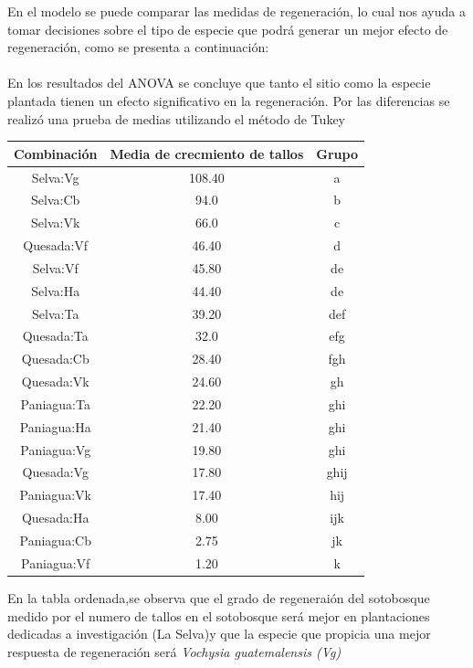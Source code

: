 \documentclass[12pt,a4paper]{report}
\begin{document}
\begin{enumerate}
\begin{itemize}
En el modelo se puede comparar las medidas de regeneración, lo cual nos ayuda a tomar decisiones sobre el tipo de especie que podrá generar un mejor efecto de regeneración, como se presenta a continuación: \\
\\
En los resultados del ANOVA se concluye que tanto el sitio como la especie plantada tienen un efecto significativo en la regeneración.
Por las diferencias se realizó una prueba de medias utilizando el método de Tukey \\
\begin{center}
\begin{tabular}{|c|c|c|}
\hline 
Combinación & Media de crecmiento de tallos & Grupo \\ 
\hline 
Selva:Vg  & 108.40 & a\\
\hline 
Selva:Cb & 94.0 & b\\
\hline 
Selva:Vk & 66.0 & c\\
\hline 
Quesada:Vf & 46.40 & d\\
\hline 
Selva:Vf & 45.80 & de\\
\hline 
Selva:Ha &  44.40 & de\\
\hline 
Selva:Ta &  39.20 & def\\
\hline 
Quesada:Ta &  32.0 & efg\\
\hline 
Quesada:Cb & 28.40 & fgh\\
\hline 
Quesada:Vk & 24.60 & gh\\
\hline 
Paniagua:Ta & 22.20 & ghi\\
\hline 
Paniagua:Ha & 21.40 & ghi\\
\hline 
Paniagua:Vg & 19.80 & ghi\\
\hline 
Quesada:Vg  & 17.80 & ghij\\
\hline 
Paniagua:Vk & 17.40 & hij\\
\hline 
Quesada:Ha & 8.00 & ijk\\
\hline 
Paniagua:Cb & 2.75 & jk\\
\hline 
Paniagua:Vf & 1.20 &  k\\ 
\hline 
\end{tabular} 
\end{center}

\begin{center}
\end{center}
En la tabla ordenada,se observa que el grado de regeneraión del sotobosque medido por el numero de tallos en el sotobosque será mejor en plantaciones dedicadas a  investigación (La Selva)y que la especie que propicia una mejor respuesta de regeneración será \textit{Vochysia guatemalensis (Vg)}






\end{itemize}

\end{enumerate}
\end{document}
